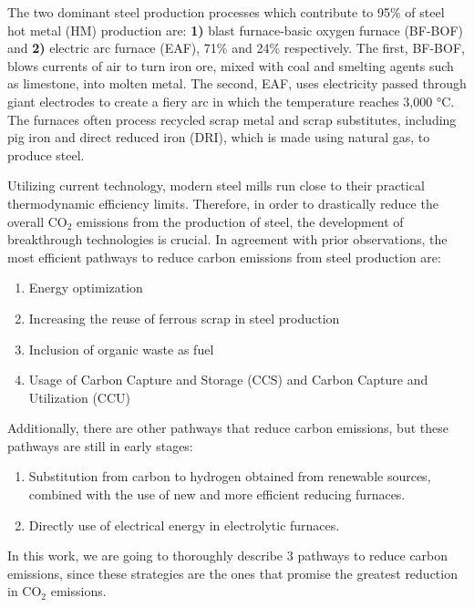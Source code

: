 The two dominant steel production processes which contribute to 95\% of steel hot metal (HM) production are: \textbf{1)} blast furnace-basic oxygen furnace (BF-BOF) and \textbf{2)} electric arc furnace (EAF), 71\% and 24\% respectively.\autocite{fan2021low} The first, BF-BOF, blows currents of air to turn iron ore, mixed with coal and smelting agents such as limestone, into molten metal. The second, EAF, uses electricity passed through giant electrodes to create a fiery arc in which the temperature reaches 3,000 °C. The furnaces often process recycled scrap metal and scrap substitutes, including pig iron and direct reduced iron (DRI), which is made using natural gas, to produce steel.\autocite{mckinsey_2020}

Utilizing current technology, modern steel mills run close to their practical thermodynamic efficiency limits. Therefore, in order to drastically reduce the overall CO$_2$ emissions from the production of steel, the development of breakthrough technologies is crucial.\autocite{rissman2020technologies} In agreement with prior observations,\autocite{aus_2022} the most efficient pathways to reduce carbon emissions from steel production are: 

\begin{enumerate}
\item Energy optimization
\item Increasing the reuse of ferrous scrap in steel production 
\item Inclusion of organic waste as fuel
\item Usage of Carbon Capture and Storage (CCS) and Carbon Capture and Utilization (CCU) 
\end{enumerate}

Additionally, there are other pathways that reduce carbon emissions, but these pathways are still in early stages:

\begin{enumerate}
\item Substitution from carbon to hydrogen obtained from renewable sources, combined with the use of new and more efficient reducing furnaces.
\item Directly use of electrical energy in electrolytic furnaces.
\end{enumerate}

In this work, we are going to thoroughly describe 3 pathways to reduce carbon emissions, since these strategies are the ones that promise the greatest reduction in CO$_2$ emissions.\autocite{elkerbout2021impact}

